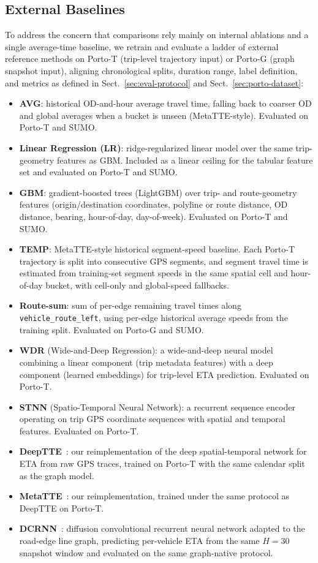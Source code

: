 \subsection{External Baselines}\label{sec:baselines}
To address the concern that comparisons rely mainly on internal ablations and a single average-time baseline, we retrain and evaluate a ladder of external reference methods on Porto-T (trip-level trajectory input) or Porto-G (graph snapshot input), aligning chronological splits, duration range, label definition, and metrics as defined in Sect.~\ref{sec:eval-protocol} and Sect.~\ref{sec:porto-dataset}:
\begin{itemize}
    \item \textbf{AVG}: historical OD-and-hour average travel time, falling back to coarser OD and global averages when a bucket is unseen (MetaTTE-style). Evaluated on Porto-T and SUMO.
    \item \textbf{Linear Regression (LR)}: ridge-regularized linear model over the same trip-geometry features as GBM. Included as a linear ceiling for the tabular feature set and evaluated on Porto-T and SUMO.
    \item \textbf{GBM}: gradient-boosted trees (LightGBM) over trip- and route-geometry features (origin/destination coordinates, polyline or route distance, OD distance, bearing, hour-of-day, day-of-week). Evaluated on Porto-T and SUMO.
    \item \textbf{TEMP}: MetaTTE-style historical segment-speed baseline. Each Porto-T trajectory is split into consecutive GPS segments, and segment travel time is estimated from training-set segment speeds in the same spatial cell and hour-of-day bucket, with cell-only and global-speed fallbacks.
    \item \textbf{Route-sum}: sum of per-edge remaining travel times along \texttt{vehicle\_route\_left}, using per-edge historical average speeds from the training split. Evaluated on Porto-G and SUMO.
    \item \textbf{WDR} (Wide-and-Deep Regression): a wide-and-deep neural model combining a linear component (trip metadata features) with a deep component (learned embeddings) for trip-level ETA prediction. Evaluated on Porto-T.
    \item \textbf{STNN} (Spatio-Temporal Neural Network): a recurrent sequence encoder operating on trip GPS coordinate sequences with spatial and temporal features. Evaluated on Porto-T.
    \item \textbf{DeepTTE}~\cite{deepTTE2018}: our reimplementation of the deep spatial-temporal network for ETA from raw GPS traces, trained on Porto-T with the same calendar split as the graph model.
    \item \textbf{MetaTTE}~\cite{wang2022metatte}: our reimplementation, trained under the same protocol as DeepTTE on Porto-T.
    \item \textbf{DCRNN}~\cite{dcrnn2018}: diffusion convolutional recurrent neural network adapted to the road-edge line graph, predicting per-vehicle ETA from the same $H{=}30$ snapshot window and evaluated on the same graph-native protocol.
\end{itemize}
